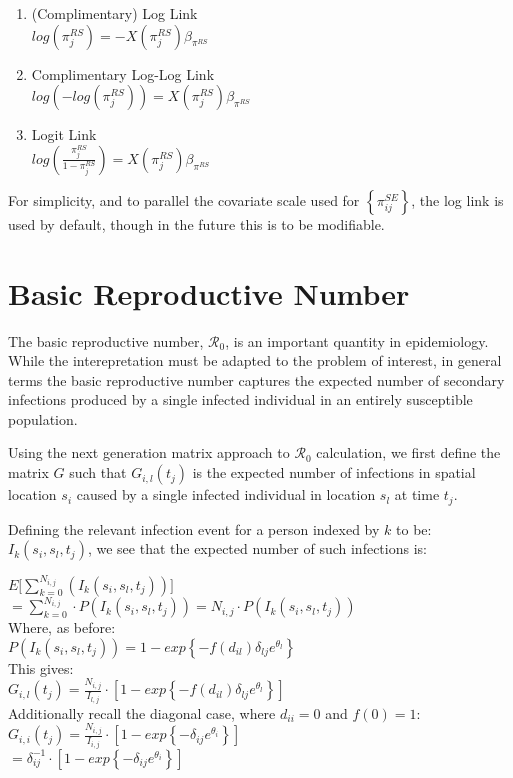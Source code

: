 \documentclass[12pt]{article}
\newcommand \mbreak {\\ \vspace{0.1in}}
\begin{document}
\begin{enumerate}
    \item (Complimentary) Log Link \\
    $log(\pi_j^{RS}) = -X(\pi_j^{RS}) \beta_{\pi^{RS}}$
    \item Complimentary Log-Log Link \\
    $log(-log(\pi_j^{RS})) = X(\pi_j^{RS}) \beta_{\pi^{RS}}$
    \item Logit Link \\
    $log(\frac{\pi_j^{RS}}{1-\pi_j^{RS}}) = X(\pi_j^{RS}) \beta_{\pi^{RS}}$
\end{enumerate}

For simplicity, and to parallel the covariate scale used for $\left\{\pi_{ij}^{SE} \right\}$, the log link is used by default, 
though in the future this is to be modifiable. 

\section{Basic Reproductive Number}

The basic reproductive number, $\mathcal{R}_0$, is an important quantity in epidemiology. While the interepretation must be adapted to 
the problem of interest, in general terms the basic reproductive number captures the expected number of secondary 
infections produced by a single infected individual in an entirely susceptible population. 

Using the next generation matrix approach to $\mathcal{R}_0$ calculation, we first define the matrix $G$ such 
that $G_{i,l}(t_j)$ is the expected number of infections in spatial location $s_i$ caused by a single infected
individual in location $s_l$ at time $t_j$.

Defining the relevant infection event for a person indexed by $k$ to be: $I_k(s_i, s_l, t_j)$, we see that the expected number of such
infections is:

\begin{center}
    $\displaystyle E\big[ \sum_{k=0}^{N_{i,j}}(I_k(s_i, s_l, t_j)) \big]$ \mbreak
    $\displaystyle = \sum_{k=0}^{N_{i,j}}\cdot P(I_k(s_i, s_l, t_j)) = N_{i,j}\cdot P(I_k(s_i, s_l, t_j)) $ \mbreak 
    Where, as before: \mbreak
    $ P(I_k(s_i, s_l, t_j)) = 1-exp\left\{-f(d_{il})\delta_{lj}e^{\theta_{l}} \right\}$ \mbreak
    This gives: \mbreak
    $G_{i,l}(t_j) = \frac{N_{i,j}}{I_{l,j}}\cdot \left[1-exp\left\{-f(d_{il})\delta_{lj}e^{\theta_{l}} \right\}\right]$ \mbreak
    Additionally recall the diagonal case, where $d_{ii} = 0$ and $f(0) = 1$:\mbreak 
    $G_{i,i}(t_j) = \frac{N_{i,j}}{I_{i,j}}\cdot \left[1-exp\left\{-\delta_{ij}e^{\theta_{i}} \right\}\right]$ \mbreak
    $ = \delta_{ij}^{-1}\cdot \left[1-exp\left\{-\delta_{ij}e^{\theta_{i}} \right\}\right]$ \mbreak
\end{center}
\end{document}
